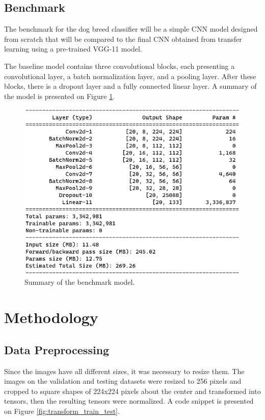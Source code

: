 \documentclass{article}
\begin{document}
    \subsection{Benchmark}
    
    The benchmark for the dog breed classifier will be a simple CNN model designed from scratch that will be compared to the final CNN obtained from transfer learning using a pre-trained VGG-11 model.
    
    The baseline model contains three convolutional blocks, each presenting a convolutional layer, a batch normalization layer, and a pooling layer. After these blocks, there is a dropout layer and a fully connected linear layer. A summary of the model is presented on Figure \ref{fig:model_summary}.
    
    \begin{figure}[htbp]
        \centering
        \includegraphics{img/model_summary.png}
        \caption{Summary of the benchmark model.}
        \label{fig:model_summary}
    \end{figure}
    
    \section{Methodology}

    \subsection{Data Preprocessing}

    Since the images have all different sizes, it was necessary to resize them. The images on the validation and testing datasets were resized to 256 pixels and cropped to square shapes of 224x224 pixels about the center and transformed into tensors, then the resulting tensors were normalized. A code snippet is presented on Figure \ref{fig:transform_train_test}.
\end{document}
